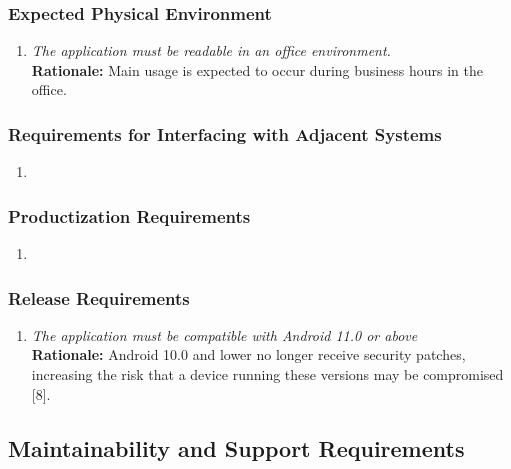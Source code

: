 \documentclass[]{article}
\begin{document}
\begin{enumerate}[{\bf BE1.}]
\subsubsection{Expected Physical Environment}
\label{ssub:expected_physical_environment}
\begin{enumerate}[{OE-EPE}1. ]
    \item \emph{The application must be readable in an office environment. }\\
    {\bf Rationale:} Main usage is expected to occur during business hours in the office.
\end{enumerate}


\subsubsection{Requirements for Interfacing with Adjacent Systems}
\label{ssub:requirements_for_interfacing_with_adjacent_systems}
\begin{enumerate}[{NA}]
    \item 
\end{enumerate}


\subsubsection{Productization Requirements}
\label{ssub:productization_requirements}
\begin{enumerate}[{NA}]
    \item
\end{enumerate}


\subsubsection{Release Requirements}
\label{ssub:release_requirements}
\begin{enumerate}[{OE-R}1. ]
    \item \emph{The application must be compatible with Android 11.0 or above}\\
    {\bf Rationale:} Android 10.0 and lower no longer receive security patches, increasing the risk that a device running these versions may be compromised [8].
\end{enumerate}




\subsection{Maintainability and Support Requirements}
\label{sub:maintainability_and_support_requirements}



\end{enumerate}
\end{document}
